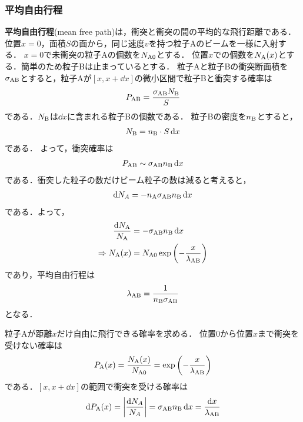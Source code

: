 \documentclass{report}
\begin{document}
      \subsubsection{平均自由行程}
        \textbf{平均自由行程}(mean free path)は，衝突と衝突の間の平均的な飛行距離である．
        位置$x = 0$，面積$S$の面から，同じ速度$v$を持つ粒子Aのビームを一様に入射する．
        $x = 0$で未衝突の粒子Aの個数を$N_{\mathrm{A}0}$とする．
        位置$x$での個数を$N_{\mathrm{A}}(x)$とする．簡単のため粒子Bは止まっているとする．
        粒子Aと粒子Bの衝突断面積を$\sigma_{\mathrm{AB}}$とすると，粒子Aが$[x, x + \dd{x}]$の微小区間で粒子Bと衝突する確率は
        \begin{align}
          P_{\mathrm{AB}} = \frac{\sigma_{\mathrm{AB}}N_{\mathrm{B}}}{S}
        \end{align}
        である．$N_{\mathrm{B}}$は$\dd{x}$に含まれる粒子Bの個数である．
        粒子Bの密度を$n_{\mathrm{B}}$とすると，
        \begin{align}
          N_{\mathrm{B}} = n_{\mathrm{B}}\cdot S \dd{x}
        \end{align}
        である．
        よって，衝突確率は
        \begin{align}
          P_{\mathrm{AB}} \sim \sigma_{\mathrm{AB}} n_{\mathrm{B}} \dd{x}
        \end{align}
        である．衝突した粒子の数だけビーム粒子の数は減ると考えると，
        \begin{align}
          \dd{N_A} = -n_{\mathrm{A}} \sigma_{\mathrm{AB}} n_{\mathrm{B}} \dd{x}
        \end{align}
        である．よって，
        \begin{align}
          \frac{\dd{N_{\mathrm{A}}}}{N_{\mathrm{A}}} &= - \sigma_{\mathrm{AB}} n_{\mathrm{B}} \dd{x}\\
          \Rightarrow N_{\mathrm{A}}(x) &= N_{\mathrm{A0}} \exp\qty(-\frac{x}{\lambda_{\mathrm{AB}}})
        \end{align}
        であり，平均自由行程は
        \begin{align}
          \lambda_{\mathrm{AB}} = \frac{1}{n_{\mathrm{B}} \sigma_{\mathrm{AB}}}
        \end{align}
        となる．
        \par
        粒子Aが距離$x$だけ自由に飛行できる確率を求める．
        位置$0$から位置$x$まで衝突を受けない確率は
        \begin{align}
          P_{\mathrm{A}}(x) = \frac{N_{\mathrm{A}}(x)}{N_{\mathrm{A0}}} = \exp\qty(-\frac{x}{\lambda_{\mathrm{AB}}})
        \end{align}
        である．$[x, x+\dd{x}]$の範囲で衝突を受ける確率は
        \begin{align}
          \dd{P_{\mathrm{A}}(x)} = \abs{\frac{\dd{N_A}}{N_A}} = \sigma_{\mathrm{AB}} n_{\mathrm{B}} \dd{x} = \frac{\dd{x}}{\lambda_{\mathrm{AB}}}
        \end{align}
\end{document}
